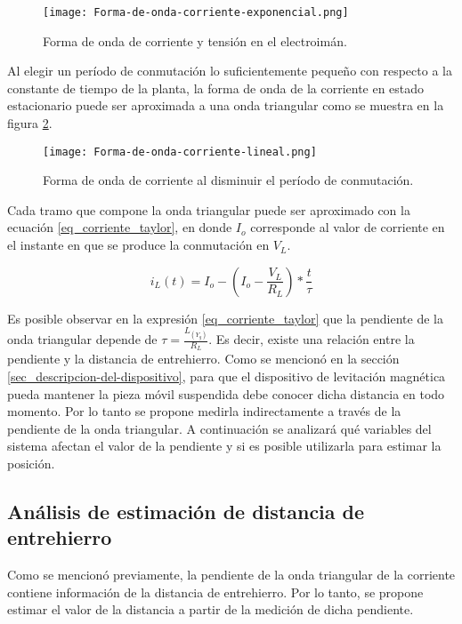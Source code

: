 \begin{figure}[H]
	\centering
	\texttt{[image: Forma-de-onda-corriente-exponencial.png]}
	\caption{Forma de onda de corriente y tensión en el electroimán.}
	\label{fig:img_corriente_exponencial}
\end{figure}

Al elegir un período de conmutación lo suficientemente pequeño con respecto a la constante de tiempo de la planta, la forma de onda de la corriente en estado estacionario puede ser aproximada a una onda triangular como se muestra en la figura \ref{fig:img_corriente_lineal}. 

\begin{figure}[H]
	\centering
	\texttt{[image: Forma-de-onda-corriente-lineal.png]}
	\caption{Forma de onda de corriente al disminuir el período de conmutación.}
	\label{fig:img_corriente_lineal}
\end{figure}

Cada tramo que compone la onda triangular puede ser aproximado con la ecuación \ref{eq_corriente_taylor}, en donde $I_o$ corresponde al valor de corriente en el instante en que se produce la conmutación en $V_L$.

\begin{equation} \label{eq_corriente_taylor}
	i_L(t)=I_o -  (I_o-\frac{V_L}{R_L})*\frac{t}{\tau}
\end{equation}

Es posible observar en la expresión \ref{eq_corriente_taylor} que la pendiente de la onda triangular depende de $\tau=\frac{L_{(Y_g)}}{R_L}$. Es decir, existe una relación entre la pendiente y la distancia de entrehierro. Como se mencionó en la sección \ref{sec_descripcion-del-dispositivo}, para que el dispositivo de levitación magnética pueda mantener la pieza móvil suspendida debe conocer dicha distancia en todo momento. Por lo tanto se propone medirla indirectamente a través de la pendiente de la onda triangular. A continuación se analizará qué variables del sistema afectan el valor de la pendiente y si es posible utilizarla para estimar la posición.

\subsection{Análisis de estimación de distancia de entrehierro} \label{sec_analisis_estimacion}

Como se mencionó previamente, la pendiente de la onda triangular de la corriente contiene información de la distancia de entrehierro. Por lo tanto, se propone estimar el valor de la distancia a partir de la medición de dicha pendiente. 

